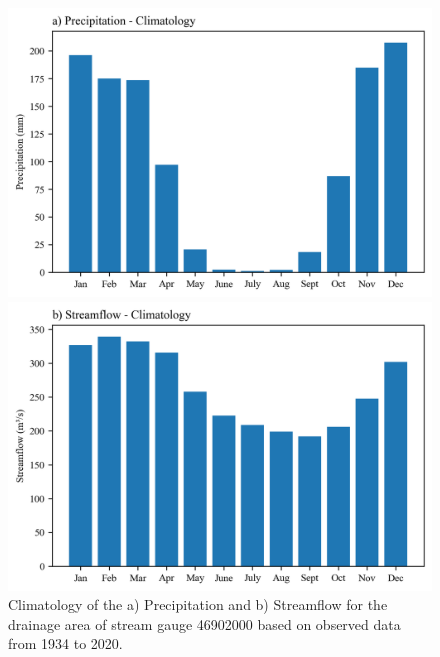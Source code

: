         \begin{figure}
            \centering
                \begin{minipage}[t]{0.49\linewidth}
                    \includegraphics[width = \linewidth]{
                        figs/Pr_Clim.png}
                \end{minipage}
                \hfill    
                \begin{minipage}[t]{0.49\linewidth}
                    \includegraphics[width = \linewidth]{
                        figs/Vazao_Clim.png}
                \end{minipage}
                
            \caption{
                Climatology of the a) Precipitation and b) Streamflow for the drainage area of  stream gauge 46902000 based on observed data from 1934 to 2020.
            }
            \label{fig:Clima}
        \end{figure}

